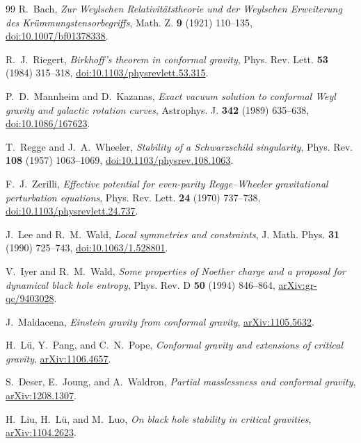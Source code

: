 \documentclass[11pt]{article}
\theoremstyle{definition}
\theoremstyle{remark}
\begin{document}
\begingroup
\raggedright
\begin{thebibliography}{99}
R.~Bach,
\emph{Zur Weylschen Relativit\"atstheorie und der Weylschen Erweiterung des
Kr\"ummungstensorbegriffs}, Math. Z. \textbf{9} (1921) 110--135,
\href{https://doi.org/10.1007/bf01378338}{doi:10.1007/bf01378338}.

R.~J.~Riegert,
\emph{Birkhoff's theorem in conformal gravity},
Phys. Rev. Lett. \textbf{53} (1984) 315--318,
\href{https://doi.org/10.1103/physrevlett.53.315}{doi:10.1103/physrevlett.53.315}.

P.~D.~Mannheim and D.~Kazanas,
\emph{Exact vacuum solution to conformal Weyl gravity and galactic rotation
curves}, Astrophys. J. \textbf{342} (1989) 635--638,
\href{https://doi.org/10.1086/167623}{doi:10.1086/167623}.

T.~Regge and J.~A.~Wheeler,
\emph{Stability of a Schwarzschild singularity},
Phys. Rev. \textbf{108} (1957) 1063--1069,
\href{https://doi.org/10.1103/physrev.108.1063}{doi:10.1103/physrev.108.1063}.

F.~J.~Zerilli,
\emph{Effective potential for even-parity Regge--Wheeler gravitational
perturbation equations}, Phys. Rev. Lett. \textbf{24} (1970) 737--738,
\href{https://doi.org/10.1103/physrevlett.24.737}{doi:10.1103/physrevlett.24.737}.

J.~Lee and R.~M.~Wald,
\emph{Local symmetries and constraints},
J. Math. Phys. \textbf{31} (1990) 725--743,
\href{https://doi.org/10.1063/1.528801}{doi:10.1063/1.528801}.

V.~Iyer and R.~M.~Wald,
\emph{Some properties of Noether charge and a proposal for dynamical black
hole entropy}, Phys. Rev. D \textbf{50} (1994) 846--864,
\href{https://arxiv.org/abs/gr-qc/9403028}{arXiv:gr-qc/9403028}.

J.~Maldacena,
\emph{Einstein gravity from conformal gravity},
\href{https://arxiv.org/abs/1105.5632}{arXiv:1105.5632}.

H.~L\"u, Y.~Pang, and C.~N.~Pope,
\emph{Conformal gravity and extensions of critical gravity},
\href{https://arxiv.org/abs/1106.4657}{arXiv:1106.4657}.

S.~Deser, E.~Joung, and A.~Waldron,
\emph{Partial masslessness and conformal gravity},
\href{https://arxiv.org/abs/1208.1307}{arXiv:1208.1307}.

H.~Liu, H.~L\"u, and M.~Luo,
\emph{On black hole stability in critical gravities},
\href{https://arxiv.org/abs/1104.2623}{arXiv:1104.2623}.


\end{thebibliography}
\end{document}
